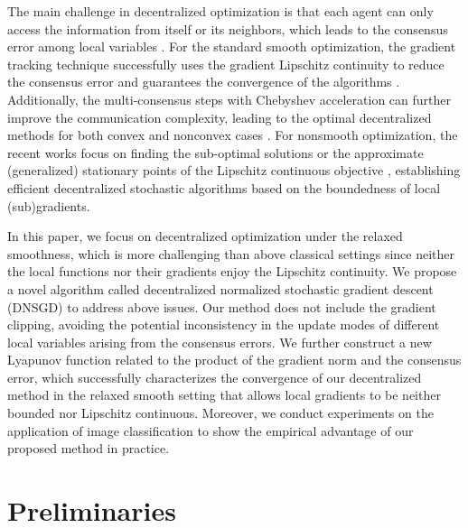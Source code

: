 \documentclass[sigconf]{acmart}
\theoremstyle{plain}
\begin{document}
The main challenge in decentralized optimization is that each agent can only access the information from itself or its neighbors, which leads to the consensus error among local variables \citep{nedic2018network}.
For the standard smooth optimization, the gradient tracking technique successfully uses the gradient Lipschitz continuity to reduce the consensus error and guarantees the convergence of the algorithms \citep{nedic2017achieving,qu2017harnessing}.
Additionally, the multi-consensus steps with Chebyshev acceleration \citep{liu2011accelerated,arioli2014chebyshev} can further improve the communication complexity, leading to the optimal decentralized methods for both convex and nonconvex cases \citep{song2024optimal,xin2020general,hendrikx2021optimal,li2022variance,metelev2024decentralized,liu2024decentralized,luo2022complexity,ye2023multi,bai2024complexity,yuan2022revisiting,lu2021optimal}.
For nonsmooth optimization, the recent works focus on finding the sub-optimal solutions or the approximate (generalized) stationary points of the Lipschitz continuous objective \citep{sahinoglu2024online,lin2023decentralized,kovalev2024lower,lan2020communication}, establishing efficient decentralized stochastic algorithms based on the boundedness of local (sub)gradients.

In this paper, we focus on decentralized optimization under the relaxed smoothness, which is more challenging than above classical settings since neither the local functions nor their gradients enjoy the Lipschitz continuity.
We propose a novel algorithm called decentralized normalized stochastic gradient descent (DNSGD) to address above issues.
Our method does not include the gradient clipping, avoiding the potential inconsistency in the update modes of different local variables arising from the consensus errors.
We further construct a new Lyapunov function related to the product
of the gradient norm and the consensus error, which successfully characterizes the 
convergence of our decentralized method in the relaxed smooth setting that allows local gradients to be neither bounded nor Lipschitz continuous.
Moreover, we conduct experiments on the application of image classification to show the empirical advantage of our proposed method in practice.

\section{Preliminaries}
\end{document}

